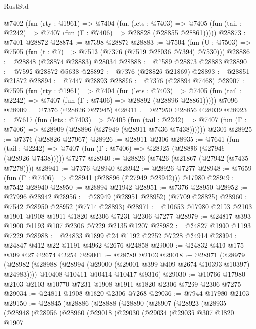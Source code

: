 \begin{lexlean}{RustStd}
\begin{coremodule}
  @7402
    (fun (rty : @1961) =>
    @7404
      (fun (lets : @7403) =>
      @7405 (fun (tail : @2242) => @7407 (fun (Γ : @7406) => @28828 (@28855 @28861)))))
@28873 := @7401 @28872
@28874 := @7398 @28873
@28883 := @7504
    (fun (U : @7503) => @7505 (fun (t : @7) => @7513 (@7376 (@7519 @28036 @7394) @7530)))
@28886 := @28848 (@28874 @28883) @28034
@28888 := @7589 @28873 @28883
@28890 := @7592 @28872 @5638
@28892 := @7376 (@28826 @21869)
@28893 := @28851 @21872
@28894 := @7447 @28893
@28896 := @7376 (@28894 @7468)
@28907 := @7595
    (fun (rty : @1961) =>
    @7404
      (fun (lets : @7403) =>
      @7405 (fun (tail : @2242) => @7407 (fun (Γ : @7406) => @28892 (@28896 @28861)))))
    @7096
@28909 := @7376 (@28826 @27945)
@28911 := @27950 @28856 @28039
@28923 := @7617
    (fun (lets : @7403) =>
    @7405
      (fun (tail : @2242) =>
      @7407 (fun (Γ : @7406) => @28909 (@28896 (@27949 (@28911 @7436 @7438))))))
    @2306
@28925 := @7376 (@28826 @27967)
@28926 := @28911 @2306
@28935 := @7641
    (fun (tail : @2242) => @7407 (fun (Γ : @7406) => @28925 (@28896 (@27949 (@28926 @7438)))))
    @7277
@28940 := @28826 (@7426 (@21867 (@27942 (@7435 @7278))))
@28941 := @7376 @28940
@28942 := @28926 @7277
@28948 := @7659 (fun (Γ : @7406) => @28941 (@28896 (@27949 @28942))) @17980
@28949 := @7542 @28940
@28950 := @28894 @21942
@28951 := @7376 @28950
@28952 := @27996 @28942
@28956 := @28949 (@28951 @28952) (@7709 @28825)
@28960 := @7542 @28950 @28952 (@7714 @28893)
@28971 := @10653 @17980 @2103 @2103 @1901 @1908 @1911 @1820 @2306 @7231 @2306 @7277
@28979 := @24817 @393 @1900 @1193 @107 @2306 @7229 @2135 @1207
@28982 := @24827 @1900 @1193 @7229
@28988 := @24833 @1899 @24 @1192 @2252 @7228 @24914
@28994 := @24847 @412 @22 @1191 @4962 @2676 @24858
@29000 := @24832 @410 @175 @399 @27 @2674 @2254
@29001 := @28789 @2103
@29018 := @28971
    (@28979
      (@28982 (@28988 (@28994 (@29000 (@29001 @399 @409 @2674 @10393 @10397) @24983))))
      @10408
      @10411
      @10414
      @10417
      @9316)
@29030 := @10766 @17980 @2103 @2103 @10770 @7231 @1908 @1911 @1820 @2306 @7269 @2306 @7275
@29034 := @24811 @1908 @1820 @2306 @7268
@29036 := @7944 @17980 @2103
@29150 := @28845
    (@28886
      (@28888
        (@28890
          (@28907
            (@28923
              (@28935
                (@28948
                  (@28956
                    (@28960
                      (@29018
                        (@29030
                          (@29034
                            (@29036
                              @307
                              @1820
                              @1907

\end{coremodule}
\end{lexlean}
